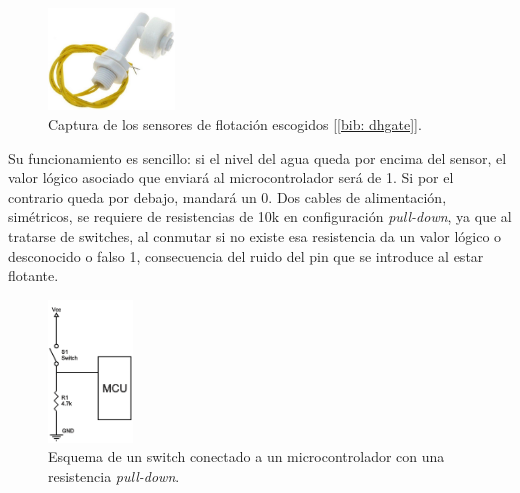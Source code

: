 \documentclass[12pt]{article}
\begin{document}
	 \begin{figure}[h!]
	 	\begin{center}
	 		\includegraphics[width=0.3\textwidth]{img/sensor_flotacion.png}
	 		\caption{Captura de los sensores de flotación escogidos [\ref{bib: dhgate}].}
	 		\label{Sensor de flotación}
	 	\end{center}
	 \end{figure}
 
	 \noindent Su funcionamiento es sencillo: si el nivel del agua queda por encima del sensor, el valor lógico asociado que enviará al microcontrolador será de 1. Si por el contrario queda por debajo, mandará un 0. Dos cables de alimentación, simétricos, se requiere de resistencias de 10k en configuración \textit{pull-down}, ya que al tratarse de switches, al conmutar si no existe esa resistencia da un valor lógico o desconocido o falso 1, consecuencia del ruido del pin que se introduce al estar flotante.\\
	
	\begin{figure}[h]
		\begin{center}
			\includegraphics[width=0.2\textwidth]{img/pull-down-resistor.png}
			\caption{Esquema de un switch conectado a un microcontrolador con una resistencia \textit{pull-down}.}
			\label{Esquema resistencia pull-down}
		\end{center}
	\end{figure}
	
	
	\pagebreak
	
\end{document}
